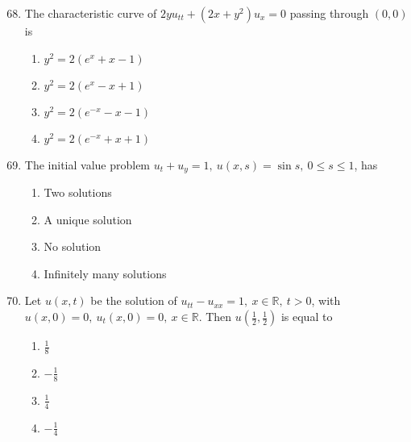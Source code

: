 \documentclass[journal,12pt,onecolumn]{IEEEtran}
\theoremstyle{remark}
\begin{document}
\begin{enumerate}
\setcounter{enumi}{67}

\item The characteristic curve of \( 2y u_{tt} + (2x + y^2) u_x = 0 \) passing through \((0,0)\) is
\\[-0.3em]\makebox[\textwidth][r]{\textit{[GATE EE 2025]}}

\begin{multicols}{2}
\begin{enumerate}[label=(\Alph*)]
\item \( y^2 = 2\left( e^x + x - 1 \right) \)
\item \( y^2 = 2\left( e^x - x + 1 \right) \)
\item \( y^2 = 2\left( e^{-x} - x - 1 \right) \)
\item \( y^2 = 2\left( e^{-x} + x + 1 \right) \)
\end{enumerate}
\end{multicols}

\item The initial value problem \( u_t + u_y = 1, \ u(x,s) = \sin s, \ 0 \le s \le 1 \), has
\\[-0.3em]\makebox[\textwidth][r]{\textit{[GATE EE 2025]}}

\begin{multicols}{2}
\begin{enumerate}[label=(\Alph*)]
\item Two solutions
\item A unique solution
\item No solution
\item Infinitely many solutions
\end{enumerate}
\end{multicols}

\item Let \( u(x,t) \) be the solution of \( u_{tt} - u_{xx} = 1, \ x \in \mathbb{R}, \ t > 0 \), with  
\( u(x,0) = 0, \ u_t(x,0) = 0, \ x \in \mathbb{R} \).  
Then \( u\left( \frac12, \frac12 \right) \) is equal to
\\[-0.3em]\makebox[\textwidth][r]{\textit{[GATE EE 2025]}}

\begin{multicols}{2}
\begin{enumerate}[label=(\Alph*)]
\item \( \frac18 \)
\item \( -\frac18 \)
\item \( \frac14 \)
\item \( -\frac14 \)
\end{enumerate}
\end{multicols}





\end{enumerate}
\end{document}
